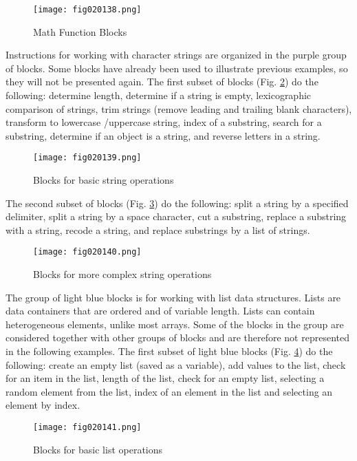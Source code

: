 \begin{figure}[H]
   \centering
   \texttt{[image: fig020138.png]}
   \caption{Math Function Blocks}
\label{fig020138}
\end{figure}

Instructions for working with character strings are organized in the purple group of blocks. Some blocks have already been used to illustrate previous examples, so they will not be presented again. The first subset of blocks (Fig. \ref{fig020139}) do the following: determine length, determine if a string is empty, lexicographic comparison of strings, trim strings (remove leading and trailing blank characters), transform to lowercase /uppercase string, index of a substring, search for a substring, determine if an object is a string, and reverse letters in a string.

\begin{figure}[H]
   \centering
   \texttt{[image: fig020139.png]}
   \caption{Blocks for basic string operations}
\label{fig020139}
\end{figure}

The second subset of blocks (Fig. \ref{fig020140}) do the following: split a string by a specified delimiter, split a string by a space character, cut a substring, replace a substring with a string, recode a string, and replace substrings by a list of strings.

\begin{figure}[H]
   \centering
   \texttt{[image: fig020140.png]}
   \caption{Blocks for more complex string operations}
\label{fig020140}
\end{figure}

The group of light blue blocks is for working with list data structures. Lists are data containers that are ordered and of variable length. Lists can contain heterogeneous elements, unlike most arrays. Some of the blocks in the group are considered together with other groups of blocks and are therefore not represented in the following examples. The first subset of light blue blocks (Fig. \ref{fig020141}) do the following: create an empty list (saved as a variable), add values to the list, check for an item in the list, length of the list, check for an empty list, selecting a random element from the list, index of an element in the list and selecting an element by index.

\begin{figure}[H]
   \centering
   \texttt{[image: fig020141.png]}
   \caption{Blocks for basic list operations}
\label{fig020141}
\end{figure}

